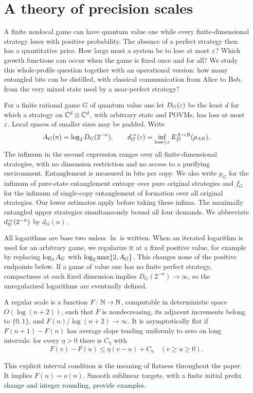 \section{A theory of precision scales}\label{sec:intro}
A finite nonlocal game can have quantum value one while every finite-dimensional strategy loses with positive probability. The absence of a perfect strategy then has a quantitative price. How large must a system be to lose at most $\varepsilon$? Which growth functions can occur when the game is fixed once and for all? We study this whole-profile question together with an operational version: how many entangled bits can be distilled, with classical communication from Alice to Bob, from the very mixed state used by a near-perfect strategy?

For a finite rational game $G$ of quantum value one let $D_G(\varepsilon)$ be the least $d$ for which a strategy on $\mathbb C^d\otimes\mathbb C^d$, with arbitrary state and POVMs, has loss at most $\varepsilon$. Local spaces of smaller sizes may be padded. Write
\begin{equation}\label{eq:resources}
 A_G(n)=\log_2 D_G(2^{-n}),\qquad
 d_G^{\to}(\varepsilon)=\inf_{\text{loss}\le\varepsilon}E_D^{A\to B}(\rho_{AB}).
\end{equation}
The infimum in the second expression ranges over all finite-dimensional strategies, with no dimension restriction and no access to a purifying environment. Entanglement is measured in bits per copy. We also write $p_G$ for the infimum of pure-state entanglement entropy over pure original strategies and $f_G$ for the infimum of single-copy entanglement of formation over all original strategies. Our lower estimates apply before taking these infima. The maximally entangled upper strategies simultaneously bound all four demands. We abbreviate $d_G^{\to}(2^{-n})$ by $d_G(n)$.

All logarithms are base two unless $\ln$ is written. When an iterated logarithm is used for an arbitrary game, we regularize it at a fixed positive value, for example by replacing $\log_2 A_G$ with $\log_2\max\{2,A_G\}$. This changes none of the positive endpoints below. If a game of value one has no finite perfect strategy, compactness at each fixed dimension implies $D_G(2^{-n})\to\infty$, so the unregularized logarithms are eventually defined.

\begin{definition}\label{def:regular}
A regular scale is a function $F\colon\mathbb N\to\mathbb N$, computable in deterministic space $O(\log(n+2))$, such that $F$ is nondecreasing, its adjacent increments belong to $\{0,1\}$, and $F(n)/\log(n+2)\to\infty$. It is asymptotically flat if $F(n+1)-F(n)$ has average slope tending uniformly to zero on long intervals: for every $\eta>0$ there is $C_\eta$ with
\[
 F(v)-F(u)\le\eta(v-u)+C_\eta\quad(v\ge u\ge0).
\]
\end{definition}
This explicit interval condition is the meaning of flatness throughout the paper. It implies $F(n)=o(n)$. Smooth sublinear targets, with a finite initial prefix change and integer rounding, provide examples.

